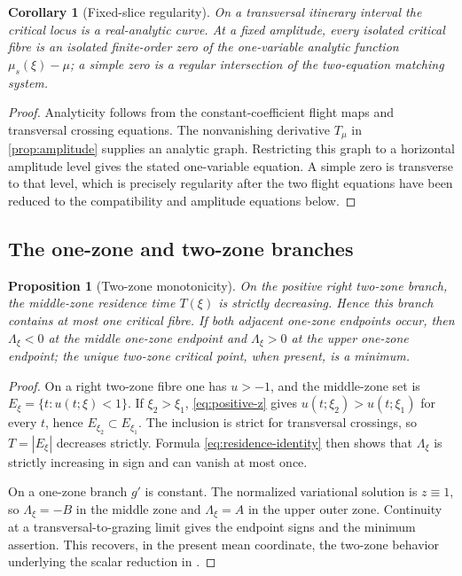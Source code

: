 \documentclass[11pt]{article}
\newtheorem{proposition}[theorem]{Proposition}
\newtheorem{corollary}[theorem]{Corollary}
\begin{document}
\begin{corollary}[Fixed-slice regularity]\label{cor:fixed-slice}
On a transversal itinerary interval the critical locus is a real-analytic curve.  At a fixed amplitude, every isolated critical fibre is an isolated finite-order zero of the one-variable analytic function $\mu_s(\xi)-\mu$; a simple zero is a regular intersection of the two-equation matching system.
\end{corollary}

\begin{proof}
Analyticity follows from the constant-coefficient flight maps and transversal crossing equations.  The nonvanishing derivative $T_\mu$ in \cref{prop:amplitude} supplies an analytic graph.  Restricting this graph to a horizontal amplitude level gives the stated one-variable equation.  A simple zero is transverse to that level, which is precisely regularity after the two flight equations have been reduced to the compatibility and amplitude equations below.
\end{proof}

\subsection{The one-zone and two-zone branches}

\begin{proposition}[Two-zone monotonicity]\label{prop:two-zone}
On the positive right two-zone branch, the middle-zone residence time $T(\xi)$ is strictly decreasing.  Hence this branch contains at most one critical fibre.  If both adjacent one-zone endpoints occur, then $\Lambda_\xi<0$ at the middle one-zone endpoint and $\Lambda_\xi>0$ at the upper one-zone endpoint; the unique two-zone critical point, when present, is a minimum.
\end{proposition}

\begin{proof}
On a right two-zone fibre one has $u>-1$, and the middle-zone set is $E_\xi=\{t:u(t;\xi)<1\}$.  If $\xi_2>\xi_1$, \eqref{eq:positive-z} gives $u(t;\xi_2)>u(t;\xi_1)$ for every $t$, hence $E_{\xi_2}\subset E_{\xi_1}$.  The inclusion is strict for transversal crossings, so $T=|E_\xi|$ decreases strictly.  Formula \eqref{eq:residence-identity} then shows that $\Lambda_\xi$ is strictly increasing in sign and can vanish at most once.

On a one-zone branch $g'$ is constant.  The normalized variational solution is $z\equiv1$, so $\Lambda_\xi=-B$ in the middle zone and $\Lambda_\xi=A$ in the upper outer zone.  Continuity at a transversal-to-grazing limit gives the endpoint signs and the minimum assertion.  This recovers, in the present mean coordinate, the two-zone behavior underlying the scalar reduction in \cite{CarmonaFreirePonceTorres2004}.
\end{proof}
\end{document}
